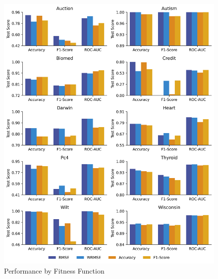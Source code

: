 
    \begin{figure}[H]
    \centering
    \includegraphics[width=\linewidth]{../Latex/Chapters/Figures/Results/RQ_Fitness_performance.png}
    \caption{Performance by Fitness Function}
    \label{fig:RQ_Fitness_performance}
    \end{figure}
    